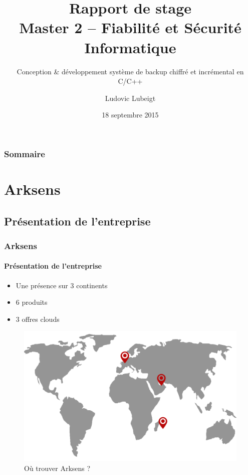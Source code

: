 \documentclass{beamer}
\title{Rapport de stage \\Master 2 -- Fiabilité et Sécurité Informatique}
\subtitle{Conception \&  d\'eveloppement syst\`eme de backup chiffr\'e et
incr\'emental en C/C++}
\author{Ludovic Lubeigt}
\institute{Aix-Marseille Universit\'e}
\date{18 septembre 2015}
\begin{document}
\begin{frame}
 \titlepage
\end{frame}

\begin{frame}
 \frametitle{Sommaire}
 \tableofcontents
\end{frame}

\section{Arksens}
\subsection{Pr\'esentation de l'entreprise}
\begin{frame}
 \frametitle{Arksens}
 \framesubtitle{Pr\'esentation de l'entreprise}
 \begin{minipage}{0.49\textwidth}
  \begin{itemize}
    \item Une pr\'esence sur 3 continents
    \item 6 produits
    \item 3 offres clouds
  \end{itemize}
 \end{minipage}
 \begin{minipage}{0.49\textwidth}
  \begin{figure}[h!]
    \centering
    \includegraphics[scale=0.13]{map_arksens.png}
    \caption{O\`u trouver Arksens ?}
  \end{figure}
 \end{minipage}
\end{frame}
\end{document}
